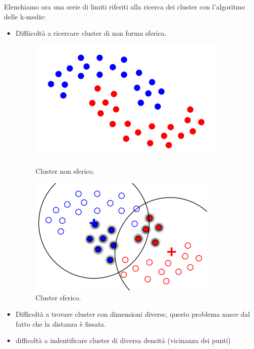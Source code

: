 Elenchiamo ora una serie di limiti riferiti alla ricerca dei cluster con l'algoritmo delle k-medie:
\begin{itemize}
	\item Diffiicoltà  a ricercare cluster di non forma sferica. 
\begin{figure}[H]
	\begin{minipage}[b]{0.47\textwidth}
		\centering
		\includegraphics[width=\textwidth]{clustering/pict/non_sferica_1.png}
		\caption{Cluster non sferico.}
	\end{minipage}
	\hfill
	\begin{minipage}[b]{0.47\textwidth}
		\centering
		\includegraphics[width=\textwidth]{clustering/pict/non_sferica_2.png}
		\caption{Cluster sferico.}
	\end{minipage}
\end{figure}
	
	\item Difficoltà a trovare cluster con dimensioni diverse, questo problema nasce dal fatto che la distanza è fissata.
	\item difficolt\`a a indentificare cluster di diversa densit\`a (vicinanza dei punti)
\end{itemize}


